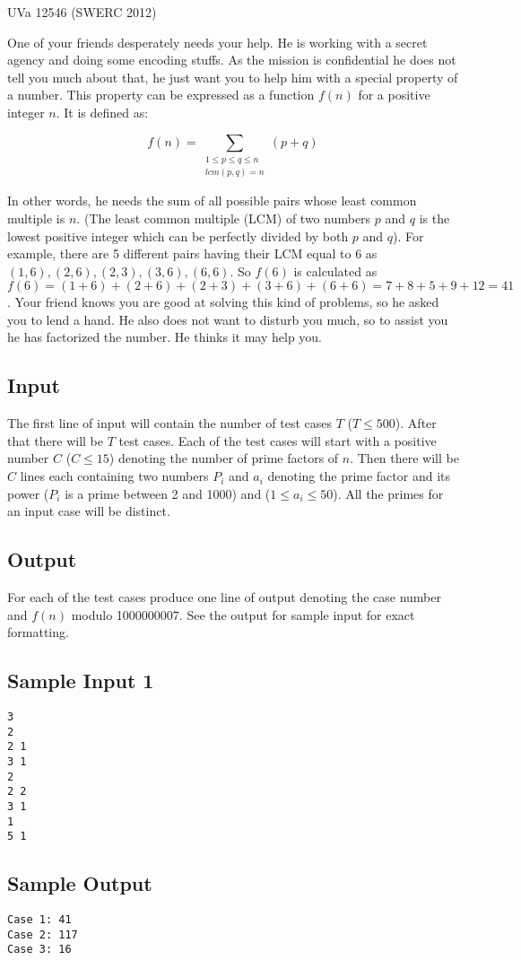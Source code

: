 

\noindent
UVa 12546 (SWERC 2012)\bigskip

One of your friends desperately needs your help. He is working with a secret agency and doing some encoding stuffs. As the mission is confidential he does not tell you much about that, he just want you to help him with a special property of a number. This property can be expressed as a function $f(n)$ for a positive integer $n$. It is defined as:

\[ f(n) = \sum_{\substack{1 \leqslant p \leqslant q \leqslant n\\lcm(p, q) = n}} (p + q) \]

In other words, he needs the sum of all possible pairs whose least common multiple is $n$. (The least common multiple (LCM) of two numbers $p$ and $q$ is the lowest positive integer which can be perfectly divided by both $p$ and $q$). For example, there are 5 different pairs having their LCM equal to 6 as $(1, 6), (2, 6), (2, 3), (3, 6), (6, 6)$. So $f(6)$ is calculated as $f(6) = (1+6)+(2+6)+(2+3)+(3+6)+(6+6) = 7 + 8 + 5 + 9 + 12 = 41$.
Your friend knows you are good at solving this kind of problems, so he asked you to lend a hand. He also does not want to disturb you much, so to assist you he has factorized the number. He thinks it may help you.

\subsection*{Input}

The first line of input will contain the number of test cases $T$ ($T \leqslant 500$). After that there will be $T$ test cases. Each of the test cases will start with a positive number $C$ ($C \leqslant 15$) denoting the number of prime factors of $n$. Then there will be $C$ lines each containing two numbers $P_i$ and $a_i$ denoting the prime factor and its power ($P_i$ is a prime between 2 and 1000) and ($1 \leqslant a_i \leqslant 50$). All the primes for an input case will be distinct.

\subsection*{Output}

For each of the test cases produce one line of output denoting the case number and $f(n)$ modulo 1000000007. See the output for sample input for exact formatting.

\subsection*{Sample Input 1}

\begin{verbatim}
3
2
2 1
3 1
2
2 2
3 1
1
5 1
\end{verbatim}

\subsection*{Sample Output}

\begin{verbatim}
Case 1: 41
Case 2: 117
Case 3: 16
\end{verbatim}
